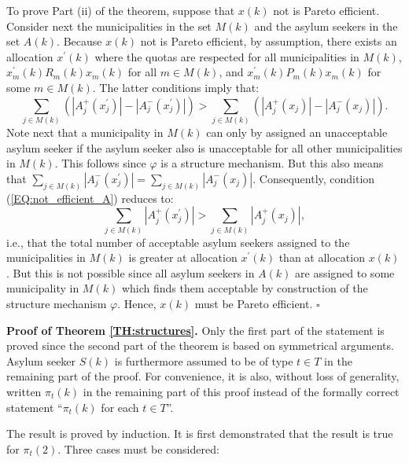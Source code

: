 \documentclass[12pt,fleqn]{article}
\begin{document}
To prove Part (ii) of the theorem, suppose that $x(k)$ not is Pareto efficient. Consider next the municipalities in the set $M(k)$ and the asylum seekers in the set $A(k)$. Because $x(k)$ not is Pareto efficient, by assumption, there exists an allocation $x^\prime(k)$ where the quotas are respected for all municipalities in $M(k)$, $x_m^\prime(k)R_m(k) x_m(k)$ for all $m\in M(k)$, and $x_m^\prime(k)P_m(k) x_m(k)$ for some $m\in M(k)$. The latter conditions imply that:
\begin{equation}
\sum_{j\in M(k)}\left(|A_j^+(x_j^\prime)|-|A_j^-(x_j^\prime)|\right)>\sum_{j\in M(k)}\left(|A_j^+({x_j})|-|A_j^-({x_j})|\right).\label{EQ:not_efficient_A}
\end{equation}
\noindent Note next that a municipality in $M(k)$ can only by assigned an unacceptable asylum seeker if the asylum seeker also is unacceptable for all other municipalities in $M(k)$. This follows since $\varphi$ is a structure mechanism. But this also means that $\sum_{j\in M(k)}|A_j^-(x_j^\prime)|=\sum_{j\in M(k)}|A_j^-({x_j})|$. Consequently, condition (\ref{EQ:not_efficient_A}) reduces to:
\begin{equation}
\sum_{j\in M(k)}|A_j^+(x_j^\prime)|>\sum_{j\in M(k)}|A_j^+({x_j})|,\label{EQ:not_efficient_B}
\end{equation}
\noindent i.e., that the total number of acceptable asylum seekers assigned to the municipalities in $M(k)$ is greater at allocation $x^\prime(k)$ than at allocation $x(k)$. But this is not possible since all asylum seekers in $A(k)$ are assigned to some municipality in $M(k)$ which finds them acceptable by construction of the structure mechanism $\varphi$. Hence, $x(k)$ must be Pareto efficient. \hfill $\square$

\medskip

\noindent\textbf{Proof of Theorem \ref{TH:structures}.} Only the first part of the statement is proved since the second part of the theorem is based on symmetrical arguments. Asylum seeker $S(k)$ is furthermore assumed to be of type $t\in T$ in the remaining part of the proof. For convenience, it is also, without loss of generality, written $\pi_t(k)$ in the remaining part of this proof instead of the formally correct statement ``$\pi_t(k)$ for each $t\in T$''.

The result is proved by induction. It is first demonstrated that the result is true for $\pi_t(2)$. Three cases must be considered:
\end{document}
